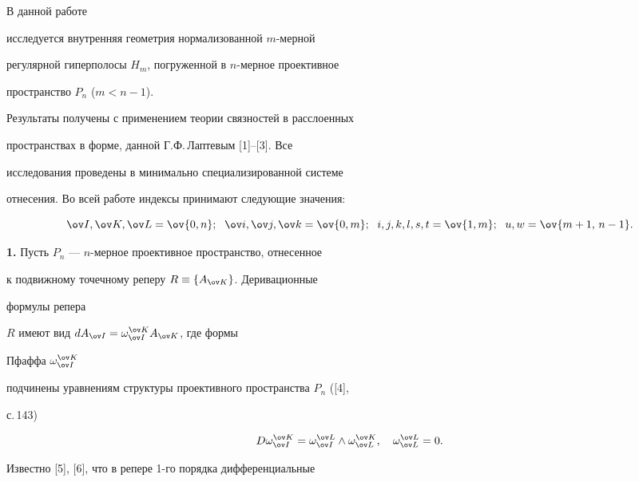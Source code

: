\maketitle 


\label{begin} 


 


В данной работе 


исследуется внутренняя геометрия нормализованной $m$-мерной 


регулярной гиперполосы $H_m$, погруженной в $n$-мерное проективное  


пространство $P_n$ ($m<n-1$). 


Результаты получены с применением теории связностей в расслоенных 


пространствах в форме, данной Г.Ф.\,Лаптевым [1]--[3]. Все  


исследования проведены в минимально специализированной системе  


отнесения. Во всей работе индексы принимают следующие значения:


$$ 


\ov I,\ov K,\ov L=\ov{0,n};\ \; \ov i,\ov j,\ov k=\ov{0,m}; 


\ \; i,j,k,l,s,t=\ov{1,m};\ \;u,w=\ov{m+1,\,n-1}. 


$$ 


 


{\bf 1.} Пусть $P_n$ --- $n$-мерное проективное пространство, отнесенное 


к подвижному точечному реперу $R\equiv\{A_{\ov K}\}$. Деривационные 


формулы репера 


$R$ имеют вид $dA_{\ov I}=\omega^{\ov K}_{\ov I}A_{\ov K}$, где формы 


Пфаффа $\omega^{\ov K}_{\ov I}$ 


подчинены уравнениям структуры проективного пространства $P_n$ ([4], 


с.\,143) 


$$ 


D\omega^{\ov K}_{\ov I}=\omega^{\ov L}_{\ov I}\wedge 


\omega^{\ov K}_{\ov L},\quad \omega^{\ov L}_{\ov L}=0. 


$$ 


 


Известно [5], [6], что в репере 1-го порядка дифференциальные  


